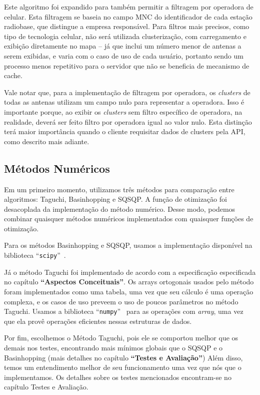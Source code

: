 \documentclass[]{politex}
\begin{document}
Este algoritmo foi expandido para também permitir a filtragem por operadora de
celular. Esta filtragem se baseia no campo MNC do identificador de cada estação
radiobase, que distingue a empresa responsável. Para filtros mais precisos, como
tipo de tecnologia celular, não será utilizada clusterização, com carregamento e
exibição diretamente no mapa -- já que inclui um número menor de antenas a serem
exibidas, e varia com o caso de uso de cada usuário, portanto sendo um processo
menos repetitivo para o servidor que não se beneficia de mecanismo de cache.

Vale notar que, para a implementação de filtragem por operadora, os \textit{clusters}
de todas as antenas utilizam um campo nulo para representar a operadora. Isso é
importante porque, ao exibir os \textit{clusters} sem filtro específico de operadora, na
realidade, deverá ser feito filtro por operadora igual ao valor nulo. Esta
distinção terá maior importância quando o cliente requisitar dados de clusters
pela API, como descrito mais adiante.

\subsection{Métodos Numéricos}

Em um primeiro momento, utilizamos três métodos para comparação entre
algoritmos: Taguchi, Basinhopping e SQSQP. A função de otimização foi
desacoplada da implementação do método numérico. Desse modo, podemos combinar
quaisquer métodos numéricos implementados com quaisquer funções de otimização.

Para os métodos Basinhopping e SQSQP, usamos a implementação disponível na
biblioteca ``\texttt{scipy}''~\cite{scipy}.

Já o método Taguchi foi implementado de acordo com a especificação especificada
no capítulo \textbf{``Aspectos Conceituais''}. Os arrays ortogonais usados pelo
método foram implementados como uma tabela, uma vez que seu cálculo é uma
operação complexa, e os casos de uso preveem o uso de poucos parâmetros no
método Taguchi. Usamos a biblioteca ``\texttt{numpy}''~\cite{numpy} para as operações com
\textit{array}, uma vez que ela provê operações eficientes nessas estruturas de dados.

Por fim, escolhemos o Método Taguchi, pois ele se comportou melhor que os demais
nos testes, encontrando mais mínimos globais que o SQSQP e o Basinhopping (mais
detalhes no capítulo \textbf{``Testes e Avaliação''})
Além disso, temos um entendimento melhor de seu funcionamento uma vez que nós
que o implementamos. Os detalhes sobre os testes mencionados
encontram-se no capítulo Testes e Avaliação.
\end{document}
